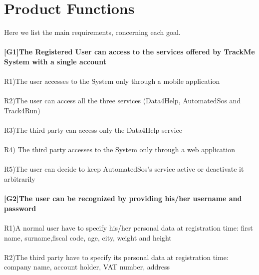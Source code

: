 \section{Product Functions}

Here we list the main requirements, concerning each goal. \\ \\
\textbf{[G1]The Registered User can access to the services offered by TrackMe System with a single account } \\ \\
R1)The user accesses to the System only through a mobile application \\ \\
R2)The user can access all the three services (Data4Help, AutomatedSos and Track4Run) \\ \\
R3)The third party can access only the Data4Help service \\ \\
R4) The third party accesses to the System only through a web application \\ \\
R5)The user can decide to keep AutomatedSos's service active or deactivate it arbitrarily \\ \\
\textbf{[G2]The user can be recognized by providing his/her username and password} \\ \\
R1)A normal user  have to specify his/her personal data at registration time: first name, surname,fiscal code, age, city, weight and height \\ \\
R2)The third party have to specify its personal data at registration time: company name, account holder, VAT number, address \newline \newline


